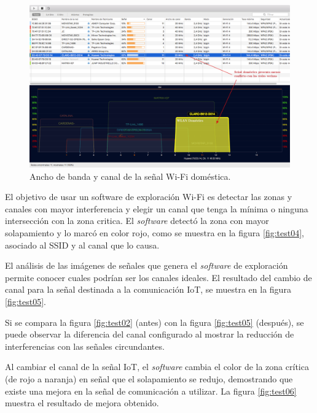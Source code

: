 \begin{landscape} %
\begin{figure}[htpb]
\centering 
\includegraphics[width=1.5\textwidth]{./Figures/wifi/03.png}
\caption{Ancho de banda  y canal de la señal Wi-Fi doméstica.}
\label{fig:test03}
\end{figure}
\end{landscape} %

El objetivo de usar un software de exploración Wi-Fi es detectar las zonas y canales con mayor interferencia y elegir un canal que tenga la mínima o ninguna intersección con la zona critica. El \emph{software} detectó la zona con mayor solapamiento y lo marcó en color rojo, como se muestra en la figura \ref{fig:test04}, asociado al SSID y al canal que lo causa.

El análisis de las imágenes de señales que genera el \emph{software} de exploración permite conocer cuales podrían ser los canales ideales. El resultado del cambio de canal para la señal destinada a la comunicación IoT, se muestra en la figura \ref{fig:test05}. 

Si se compara la figura \ref{fig:test02} (antes) con la figura \ref{fig:test05} (después), se puede observar la diferencia del canal configurado al mostrar la reducción de interferencias con las señales circundantes.

Al cambiar el canal de la señal IoT, el \emph{software} cambia el color de la zona crítica (de rojo a naranja) en señal que el solapamiento se redujo, demostrando que existe una mejora en la señal de comunicación a utilizar. La figura \ref{fig:test06} muestra el resultado de mejora obtenido.

